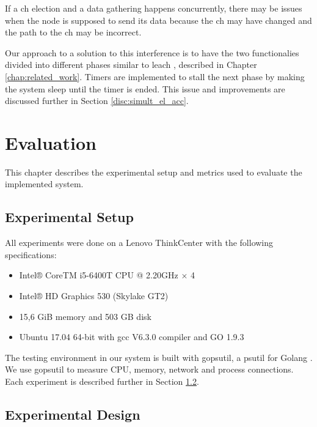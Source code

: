 \documentclass[USenglish]{uit-thesis}
\begin{document}
If a \gls{ch} election and a data gathering happens concurrently, there may be issues when the node is supposed to send its data because the \gls{ch} may have changed and the path to the \gls{ch} may be incorrect. 

Our approach to a solution to this interference is to have the two functionalies divided into different phases similar to \gls{leach} \cite{leach}, described in Chapter \ref{chap:related_work}. Timers are implemented to stall the next phase by making the system sleep until the timer is ended. This issue and improvements are discussed further in Section \ref{disc:simult_el_acc}.







\chapter{Evaluation}
This chapter describes the experimental setup and metrics used to evaluate the implemented system.

\section{Experimental Setup}
All experiments were done on a Lenovo ThinkCenter with the following specifications:

\begin{itemize} 
\item Intel® CoreTM i5-6400T CPU @ 2.20GHz × 4
\item Intel® HD Graphics 530 (Skylake GT2)
\item 15,6 GiB memory and 503 GB disk
\item Ubuntu 17.04 64-bit with gcc V6.3.0 compiler and GO 1.9.3
\end{itemize}


The testing environment in our system is built with gopsutil, a psutil for Golang \cite{golangPsutil}. We use gopsutil to measure CPU, memory, network and process connections. Each experiment is described further in Section \ref{eva:exp_des}.

\section{Experimental Design} \label{eva:exp_des}
\end{document}
